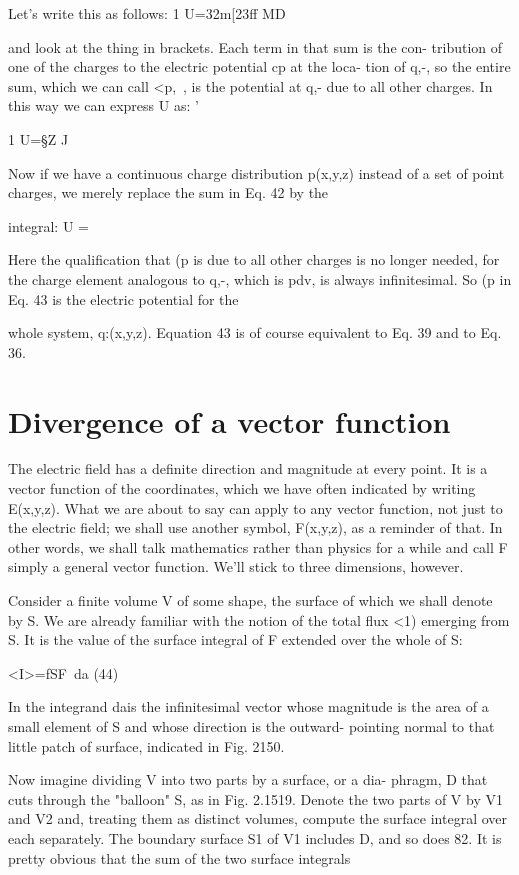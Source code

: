 Let's write this as follows:
1
U=32m[23ff MD

and look at the thing in brackets. Each term in that sum is the con-
tribution of one of the charges to the electric potential cp at the loca-
tion of q,-, so the entire sum, which we can call <p,~, is the potential at
q,- due to all other charges. In this way we can express U as: '

1
U=§Z%
J

Now if we have a continuous charge distribution p(x,y,z) instead of
a set of point charges, we merely replace the sum in Eq. 42 by the

integral:
U = %

Here the qualification that (p is due to all other charges is no longer
needed, for the charge element analogous to q,-, which is pdv, is
always infinitesimal. So (p in Eq. 43 is the electric potential for the

whole system, q:(x,y,z). Equation 43 is of course equivalent to
Eq. 39 and to Eq. 36.

\section{Divergence of a vector function}

The electric field has a definite direction and magnitude at every
point. It is a vector function of the coordinates, which we have often
indicated by writing E(x,y,z). What we are about to say can apply
to any vector function, not just to the electric field; we shall use
another symbol, F(x,y,z), as a reminder of that. In other words, we
shall talk mathematics rather than physics for a while and call F
simply a general vector function. We'll stick to three dimensions,
however.

Consider a finite volume V of some shape, the surface of which we
shall denote by S. We are already familiar with the notion of the total
flux <1) emerging from S. It is the value of the surface integral of F
extended over the whole of S:

<I>=fSF~da (44)

In the integrand dais the infinitesimal vector whose magnitude is the
area of a small element of S and whose direction is the outward-
pointing normal to that little patch of surface, indicated in Fig. 2150.

Now imagine dividing V into two parts by a surface, or a dia-
phragm, D that cuts through the "balloon" S, as in Fig. 2.1519.
Denote the two parts of V by V1 and V2 and, treating them as distinct
volumes, compute the surface integral over each separately. The
boundary surface S1 of V1 includes D, and so does 82. It is pretty
obvious that the sum of the two surface integrals

